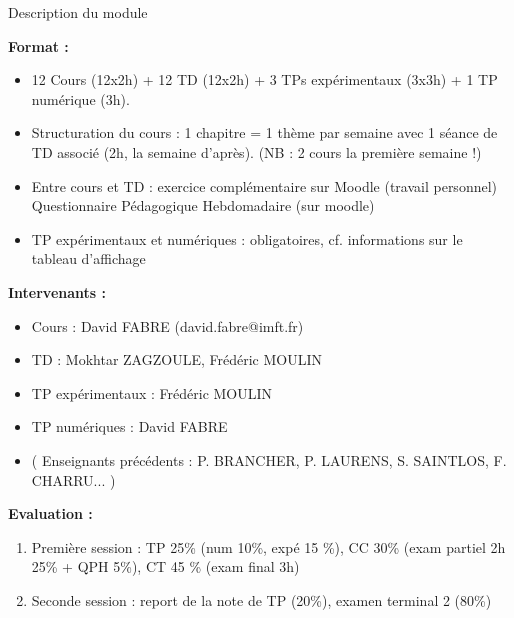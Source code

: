 \begin{frame}{Description du module}

\small


\textbf{Format :} \medskip

\begin{itemize}
\item[\checkmark]
	12 Cours (12x2h) + 12 TD (12x2h) + 3 TPs expérimentaux (3x3h) + 1 TP numérique (3h).
\item[\checkmark]
	Structuration du cours : 1 chapitre = 1 thème par semaine 
	 avec 1 séance de TD associé (2h, la semaine d'après).
	 (NB :  2 cours la première semaine !)
	
\item[\checkmark]
	Entre cours et TD : \textcolor{rouge}{exercice complémentaire} sur Moodle (travail personnel)
	 Questionnaire Pédagogique Hebdomadaire (sur moodle)
\item[\checkmark]
	TP expérimentaux et numériques : obligatoires, cf. informations sur le tableau d'affichage
\end{itemize}

\pause
\medskip

\textbf{Intervenants :} \medskip

\begin{itemize}
\item
	Cours : David FABRE (david.fabre@imft.fr)
\item
	TD : Mokhtar ZAGZOULE, Frédéric MOULIN
\item
	TP expérimentaux : Frédéric MOULIN
\item
	TP numériques : David FABRE
	
\item ( Enseignants précédents : P. BRANCHER, P. LAURENS, S. SAINTLOS, F. CHARRU... )	
\end{itemize}

\pause
\medskip

\textbf{Evaluation :} \medskip

\begin{enumerate}
\item
	Première session : TP 25\% (num 10\%, expé 15 \%), CC 30\% (exam partiel 2h 25\% + QPH 5\%), CT 45 \% (exam final 3h)  
\item 
	Seconde session : report de la note de TP (20\%), examen terminal 2 (80\%)
\end{enumerate}

\vspace{5mm}

\end{frame}




